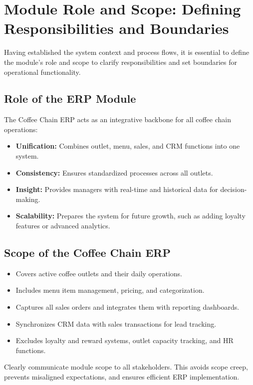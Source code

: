\section{Module Role and Scope: Defining Responsibilities and Boundaries}

Having established the system context and process flows, it is essential to define the module’s role and scope to clarify responsibilities and set boundaries for operational functionality.

\subsection*{Role of the ERP Module}
The Coffee Chain ERP acts as an integrative backbone for all coffee chain operations:
\begin{itemize}
    \item \textbf{Unification:} Combines outlet, menu, sales, and CRM functions into one system.  
    \item \textbf{Consistency:} Ensures standardized processes across all outlets.  
    \item \textbf{Insight:} Provides managers with real-time and historical data for decision-making.  
    \item \textbf{Scalability:} Prepares the system for future growth, such as adding loyalty features or advanced analytics.  
\end{itemize}

\subsection*{Scope of the Coffee Chain ERP}
\begin{itemize}
    \item Covers active coffee outlets and their daily operations.  
    \item Includes menu item management, pricing, and categorization.  
    \item Captures all sales orders and integrates them with reporting dashboards.  
    \item Synchronizes CRM data with sales transactions for lead tracking.  
    \item Excludes loyalty and reward systems, outlet capacity tracking, and HR functions.  
\end{itemize}

\begin{tcolorbox}[colback=white,colframe=odooPurple,title=Tip, fonttitle=\bfseries, coltitle=white]
Clearly communicate module scope to all stakeholders. 
This avoids scope creep, prevents misaligned expectations, and ensures efficient ERP implementation.
\end{tcolorbox}


